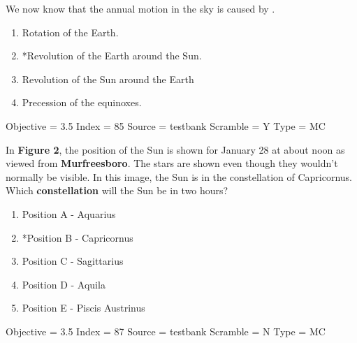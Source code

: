 \documentclass[11pt]{article}
\begin{document}
\begin{enumerate}
\begin{minipage}{\textwidth}
\begin{minipage}{\textwidth}
\item We now know that the annual motion in the sky is caused by \underline{\hspace{0.5in}}.
\begin{multicols}{2}
\begin{enumerate} 
\setlength{\itemsep}{1pt} 
\setlength{\parskip}{0pt} 
\setlength{\parsep}{0pt}
\setlength{\multicolsep}{1pt} 
\item Rotation of the Earth.
\item *Revolution of the Earth around the Sun.
\item Revolution of the Sun around the Earth
\item Precession of the equinoxes.
\end{enumerate} 
\vfill 
\end{multicols}

Objective = 3.5
Index = 85
Source = testbank
Scramble = Y
Type = MC
\end{minipage}
\end{minipage}
\vskip 0.20in

\begin{minipage}{\textwidth}
\begin{minipage}{\textwidth}
\item In {\bf Figure 2}, the position of the Sun is shown for January 28 at about noon as viewed from {\bf Murfreesboro}.  The stars are shown even though they wouldn't normally be visible.   In this image, the Sun is in the constellation of Capricornus.  Which {\bf constellation} will the Sun be in two hours?
\begin{multicols}{2}
\begin{enumerate} 
\setlength{\itemsep}{1pt} 
\setlength{\parskip}{0pt} 
\setlength{\parsep}{0pt}
\setlength{\multicolsep}{1pt} 
\item Position A - Aquarius
\item *Position B - Capricornus
\item Position C - Sagittarius
\item Position D - Aquila
\item Position E - Piscis Austrinus
\end{enumerate} 
\vfill 
\end{multicols}

Objective = 3.5
Index = 87
Source = testbank
Scramble = N
Type = MC
\end{minipage}
\end{minipage}
\vskip 0.20in


\end{enumerate}
\end{document}
